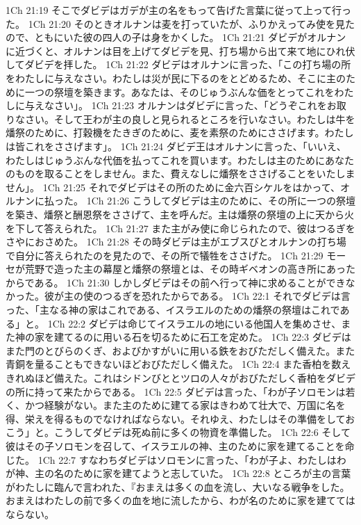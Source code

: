 1Ch 21:19  そこでダビデはガデが主の名をもって告げた言葉に従って上って行った。
1Ch 21:20  そのときオルナンは麦を打っていたが、ふりかえってみ使を見たので、ともにいた彼の四人の子は身をかくした。
1Ch 21:21  ダビデがオルナンに近づくと、オルナンは目を上げてダビデを見、打ち場から出て来て地にひれ伏してダビデを拝した。
1Ch 21:22  ダビデはオルナンに言った、「この打ち場の所をわたしに与えなさい。わたしは災が民に下るのをとどめるため、そこに主のために一つの祭壇を築きます。あなたは、そのじゅうぶんな価をとってこれをわたしに与えなさい」。
1Ch 21:23  オルナンはダビデに言った、「どうぞこれをお取りなさい。そして王わが主の良しと見られるところを行いなさい。わたしは牛を燔祭のために、打穀機をたきぎのために、麦を素祭のためにささげます。わたしは皆これをささげます」。
1Ch 21:24  ダビデ王はオルナンに言った、「いいえ、わたしはじゅうぶんな代価を払ってこれを買います。わたしは主のためにあなたのものを取ることをしません。また、費えなしに燔祭をささげることをいたしません」。
1Ch 21:25  それでダビデはその所のために金六百シケルをはかって、オルナンに払った。
1Ch 21:26  こうしてダビデは主のために、その所に一つの祭壇を築き、燔祭と酬恩祭をささげて、主を呼んだ。主は燔祭の祭壇の上に天から火を下して答えられた。
1Ch 21:27  また主がみ使に命じられたので、彼はつるぎをさやにおさめた。
1Ch 21:28  その時ダビデは主がエブスびとオルナンの打ち場で自分に答えられたのを見たので、その所で犠牲をささげた。
1Ch 21:29  モーセが荒野で造った主の幕屋と燔祭の祭壇とは、その時ギベオンの高き所にあったからである。
1Ch 21:30  しかしダビデはその前へ行って神に求めることができなかった。彼が主の使のつるぎを恐れたからである。
1Ch 22:1  それでダビデは言った、「主なる神の家はこれである、イスラエルのための燔祭の祭壇はこれである」と。
1Ch 22:2  ダビデは命じてイスラエルの地にいる他国人を集めさせ、また神の家を建てるのに用いる石を切るために石工を定めた。
1Ch 22:3  ダビデはまた門のとびらのくぎ、およびかすがいに用いる鉄をおびただしく備えた。また青銅を量ることもできないほどおびただしく備えた。
1Ch 22:4  また香柏を数えきれぬほど備えた。これはシドンびととツロの人々がおびただしく香柏をダビデの所に持って来たからである。
1Ch 22:5  ダビデは言った、「わが子ソロモンは若く、かつ経験がない。また主のために建てる家はきわめて壮大で、万国に名を得、栄えを得るものでなければならない。それゆえ、わたしはその準備をしておこう」と。こうしてダビデは死ぬ前に多くの物資を準備した。
1Ch 22:6  そして彼はその子ソロモンを召して、イスラエルの神、主のために家を建てることを命じた。
1Ch 22:7  すなわちダビデはソロモンに言った、「わが子よ、わたしはわが神、主の名のために家を建てようと志していた。
1Ch 22:8  ところが主の言葉がわたしに臨んで言われた、『おまえは多くの血を流し、大いなる戦争をした。おまえはわたしの前で多くの血を地に流したから、わが名のために家を建ててはならない。
